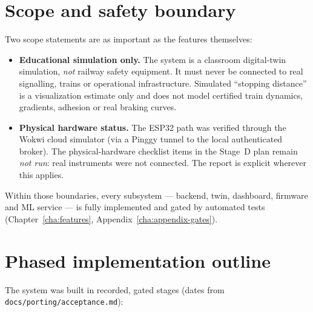 \section{Scope and safety boundary}\label{sec:scope}

Two scope statements are as important as the features themselves:

\begin{itemize}
  \item \textbf{Educational simulation only.} The system is a classroom
        digital-twin simulation, \emph{not} railway safety equipment. It
        must never be connected to real signalling, trains or operational
        infrastructure. Simulated ``stopping distance'' is a visualization
        estimate only and does not model certified train dynamics,
        gradients, adhesion or real braking curves.
  \item \textbf{Physical hardware status.} The ESP32 path was verified
        through the Wokwi cloud simulator (via a Pinggy tunnel to the
        local authenticated broker). The physical-hardware checklist items
        in the Stage~D plan remain \emph{not run}: real instruments were
        not connected. The report is explicit wherever this applies.
\end{itemize}

Within those boundaries, every subsystem --- backend, twin, dashboard,
firmware and ML service --- is fully implemented and gated by automated
tests (Chapter~\ref{cha:features}, Appendix~\ref{cha:appendix-gates}).

\section{Phased implementation outline}

The system was built in recorded, gated stages (dates from
\texttt{docs/porting/acceptance.md}):

